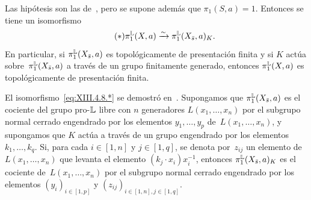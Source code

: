 
\setcounter{proposition}{7}%
\begin{corollaire} \label{XIII.4.8}
Las hipótesis son las de~, pero se supone además que
$\pi_1(S,a)=1$. Entonces se tiene un isomorfismo
\begin{equation*}
\label{eq:XIII.4.8.*} \tag{$*$}
{}\pi_1^\mathbb L(X,a)\xrightarrow{\sim}\pi_1^\mathbb L(X_{\bar{s}},a)_K.
\end{equation*}
En particular, si $\pi_1^\mathbb L(X_{\bar{s}},a)$ es topológicamente de
presentación finita y si $K$ actúa sobre~$\pi_1^\mathbb L(X_{\bar{s}},a)$ a
través de un grupo finitamente generado, entonces $\pi_1^\mathbb L(X,a)$ es
topológicamente de presentación finita.
\end{corollaire}

El isomorfismo~\eqref{eq:XIII.4.8.*} se demostró
en~. Supongamos que $\pi_1^\mathbb L(X_{\bar{s}},a)$ es el
cociente del grupo pro-$\mathbb L$ libre con $n$ generadores
$L(x_1,\dots,x_n)$ por el subgrupo normal cerrado engendrado por los
elementos $y_1,\dots,y_p$ de~$L(x_1,\dots,x_n)$, y supongamos que $K$
actúa a través de un grupo engendrado por los elementos
$k_1,\dots,k_q$. Si, para cada $i\in[1,n]$ y $j\in[1,q]$, se denota
por~$z_{ij}$ un elemento de~$L(x_1,\dots,x_n)$ que levanta el elemento
$(k_j\cdot x_i)x_i^{-1}$, entonces $\pi_1^\mathbb L(X_{\bar{s}},a)_K$ es el
cociente de~$L(x_1,\dots,x_n)$ por el subgrupo normal cerrado engendrado
por los elementos $(y_i)_{i\in[1,p]}$ y
$(z_{ij})_{i\in[1,n],j\in[1,q]}$.

{\setcounter{proposition}{5}}
{}

